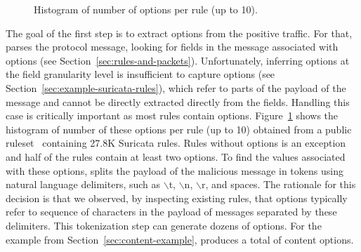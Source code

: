 \documentclass[sigconf,anonymous]{acmart}
\begin{document}
\pgfplotsset{width=6cm,compat=1.8}

\begin{figure}[t!]
  \centering
  \caption{\label{fig:distribution-contents}Histogram of number of
     options per rule (up to 10).}
\end{figure}  



The goal of the first step is to extract options from the positive
traffic. For that, \tname{} parses the protocol message, looking for
fields in the message associated with options (see
Section~\ref{sec:rules-and-packets}).
Unfortunately, inferring options at the field granularity
level is insufficient to capture  options (see
Section~\ref{sec:example-suricata-rules}), which refer to parts of the
payload of the message and cannot be directly extracted directly from
the fields. Handling this case is critically important as most rules
contain 
options. Figure~\ref{fig:distribution-contents} shows the histogram of
number of these options per rule (up to 10) obtained from a public
ruleset~\cite{emerging-threats-open} containing 27.8K Suricata
rules. Rules without  options is an exception and half
of the rules contain at least two  options.  To find
the values associated with these options, \tname{} splits the payload
of the malicious message in tokens using natural language delimiters,
such as $\backslash$t, $\backslash$n, $\backslash$r, and spaces. The
rationale for this decision is that we observed, by inspecting
existing rules, that  options typically refer to
sequence of characters in the payload of messages separated by these
delimiters. This tokenization step can generate dozens of options. For
the example from Section~\ref{sec:content-example}, \tname{} produces
a total of  content options.
\end{document}
